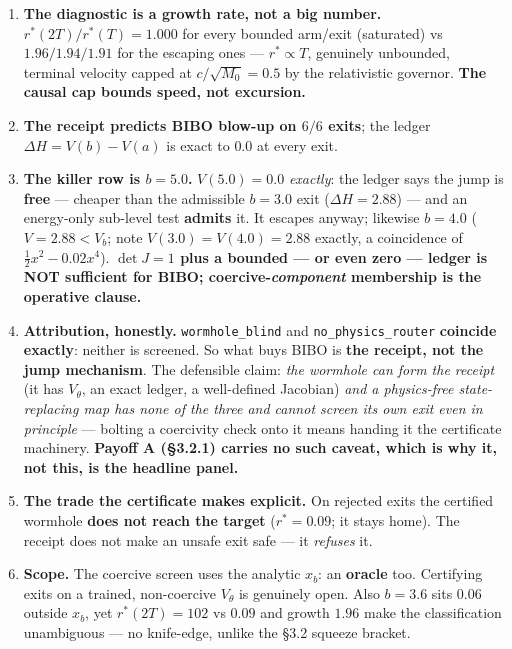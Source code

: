 \documentclass[11pt]{article}
\newcommand{\half}{\tfrac12}
\newcommand{\detJ}{\det J}
\begin{document}
\begin{enumerate}\itemsep1pt
\item \textbf{The diagnostic is a growth rate, not a big number.} $r^\ast(2T)/r^\ast(T)=1.000$ for every bounded arm/exit (saturated) vs $1.96/1.94/1.91$ for the escaping ones --- $r^\ast\propto T$, genuinely unbounded, terminal velocity capped at $c/\sqrt{M_0}=0.5$ by the relativistic governor. \textbf{The causal cap bounds speed, not excursion.}
\item \textbf{The receipt predicts BIBO blow-up on $6/6$ exits}; the ledger $\Delta H=V(b)-V(a)$ is exact to $0.0$ at every exit.
\item \textbf{The killer row is $b=5.0$.} $V(5.0)=0.0$ \emph{exactly}: the ledger says the jump is \textbf{free} --- cheaper than the admissible $b=3.0$ exit ($\Delta H=2.88$) --- and an energy-only sub-level test \textbf{admits} it. It escapes anyway; likewise $b=4.0$ ($V=2.88<V_b$; note $V(3.0)=V(4.0)=2.88$ exactly, a coincidence of $\half x^2-0.02x^4$). \textbf{$\detJ=1$ plus a bounded --- or even zero --- ledger is NOT sufficient for BIBO; coercive-\emph{component} membership is the operative clause.}
\item \textbf{Attribution, honestly.} \texttt{wormhole\_blind} and \texttt{no\_physics\_router} \textbf{coincide exactly}: neither is screened. So what buys BIBO is \textbf{the receipt, not the jump mechanism}. The defensible claim: \emph{the wormhole can form the receipt} (it has $V_\theta$, an exact ledger, a well-defined Jacobian) \emph{and a physics-free state-replacing map has none of the three and cannot screen its own exit even in principle} --- bolting a coercivity check onto it means handing it the certificate machinery. \textbf{Payoff A (\S3.2.1) carries no such caveat, which is why it, not this, is the headline panel.}
\item \textbf{The trade the certificate makes explicit.} On rejected exits the certified wormhole \textbf{does not reach the target} ($r^\ast=0.09$; it stays home). The receipt does not make an unsafe exit safe --- it \emph{refuses} it.
\item \textbf{Scope.} The coercive screen uses the analytic $x_b$: an \textbf{oracle} too. Certifying exits on a trained, non-coercive $V_\theta$ is genuinely open. Also $b=3.6$ sits $0.06$ outside $x_b$, yet $r^\ast(2T)=102$ vs $0.09$ and growth $1.96$ make the classification unambiguous --- no knife-edge, unlike the \S3.2 squeeze bracket.
\end{enumerate}
\end{document}
